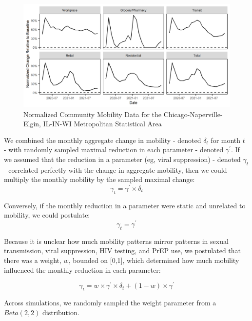 \documentclass{article}
\begin{document}
\begin{figure}[H] 
	\caption{Normalized Community Mobility Data for the Chicago-Naperville-Elgin, IL-IN-WI Metropolitan Statistical Area}\label{normalized_mobility}
	\includegraphics[width=\textwidth]{images/mobility/normalized_monthly}
\end{figure}

We combined the monthly aggregate change in mobility - denoted $\delta_t$ for month $t$ - with randomly sampled maximal reduction in each parameter - denoted $\gamma^\prime$. If we assumed that the reduction in a parameter (eg, viral suppression) - denoted $\gamma_t$ - correlated perfectly with the change in aggregate mobility, then we could multiply the monthly mobility by the sampled maximal change: 
\begin{equation*}
\gamma_t = \gamma^\prime \times \delta_t
\end{equation*}

Conversely, if the monthly reduction in a parameter were static and unrelated to mobility, we could postulate:
\begin{equation*}
\gamma_t = \gamma^\prime
\end{equation*}

Because it is unclear how much mobility patterns mirror patterns in sexual transmission, viral suppression, HIV testing, and PrEP use, we postulated that there was a weight, $w$, bounded on [0,1], which determined how much mobility influenced the monthly reduction in each parameter:

\begin{equation*}
\gamma_t = w \times \gamma^\prime \times \delta_t + (1-w) \times \gamma^\prime
\end{equation*}

Across simulations, we randomly sampled the weight parameter from a $Beta(2,2)$ distribution.
\end{document}
